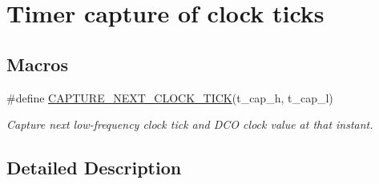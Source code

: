 \hypertarget{group__chaos__capture}{\section{Timer capture of clock ticks}
\label{group__chaos__capture}
}
\subsection*{Macros}
\begin{DoxyCompactItemize}
\item 
\#define \hyperlink{group__chaos__capture_ga1ba6973ff6fa6b3ee590efc341ea62eb}{C\-A\-P\-T\-U\-R\-E\-\_\-\-N\-E\-X\-T\-\_\-\-C\-L\-O\-C\-K\-\_\-\-T\-I\-C\-K}(t\-\_\-cap\-\_\-h, t\-\_\-cap\-\_\-l)
\begin{DoxyCompactList}\small\item\em Capture next low-\/frequency clock tick and D\-C\-O clock value at that instant. \end{DoxyCompactList}\end{DoxyCompactItemize}


\subsection{Detailed Description}


